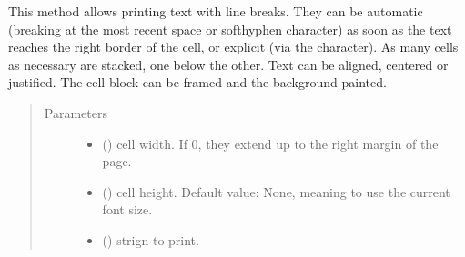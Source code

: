 \documentclass[letterpaper,10pt,english]{sphinxmanual}
\begin{document}
\begin{fulllineitems}
\begin{fulllineitems}
\label{\detokenize{generated/quality_assessment.quality_pdf_report.DefectReportPDF.multi_cell:quality_assessment.quality_pdf_report.DefectReportPDF.multi_cell}}
\sphinxAtStartPar
This method allows printing text with line breaks. They can be automatic
(breaking at the most recent space or soft\sphinxhyphen{}hyphen character) as soon as the text
reaches the right border of the cell, or explicit (via the  character).
As many cells as necessary are stacked, one below the other.
Text can be aligned, centered or justified. The cell block can be framed and
the background painted.
\begin{quote}\begin{description}
\item[{Parameters}] \leavevmode\begin{itemize}
\item {} 
\sphinxAtStartPar
{} () \textendash{} cell width. If 0, they extend up to the right margin of the page.

\item {} 
\sphinxAtStartPar
{} () \textendash{} cell height. Default value: None, meaning to use the current font size.

\item {} 
\sphinxAtStartPar
{} () \textendash{} strign to print.


\end{itemize}
\end{description}
\end{quote}
\end{fulllineitems}
\end{fulllineitems}
\end{document}
